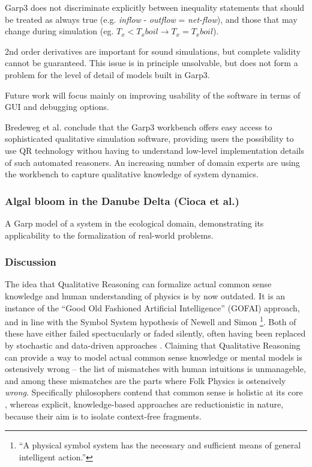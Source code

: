 \documentclass{article} %
\begin{document}
Garp3 does not discriminate explicitly between inequality statements that
should be treated as always true (e.g. \emph{inflow} - \emph{outflow} = 
\emph{net-flow}), and those that may change during simulation 
(eg. $T_x < T_xboil \rightarrow T_x = T_xboil$).

\vspace{0.8em}

2nd order derivatives are important for sound simulations, but complete
validity cannot be guaranteed. This issue is in principle unsolvable, but does
not form a problem for the level of detail of models built in Garp3.  

Future work will focus mainly on improving usability of the software in terms
of GUI and debugging options.

Bredeweg et al. conclude that the Garp3 workbench offers easy access to 
sophisticated qualitative simulation software, providing users the 
possibility to use QR technology withou having to understand low-level 
implementation details of such automated reasoners. An increasing number of 
domain experts are using the workbench to capture qualitative knowledge of 
system dynamics.  

\subsubsection{Algal bloom in the Danube Delta (Cioca et al.)}

A Garp model of a system in the ecological domain, demonstrating its
applicability to the formalization of real-world problems.


\subsubsection{Discussion}

The idea that Qualitative Reasoning can formalize actual common sense knowledge
and human understanding of physics is by now outdated. It is an instance of the
``Good Old Fashioned Artificial Intelligence'' (GOFAI) approach,
\cite{haugeland} and in line with the Symbol System hypothesis of Newell and
Simon \cite{newell}\footnote{``A physical symbol system has the necessary and
sufficient means of general intelligent action.''}.  Both of these have either
failed spectucularly or faded silently, often having been replaced by
stochastic and data-driven approaches \cite{russellnorvig}.  Claiming that
Qualitative Reasoning can provide a way to model actual common sense knowledge
or mental models is ostensively wrong -- the list of mismatches with human
intuitions is unmanageble, and among these mismatches are the parts where Folk
Physics is ostensively {\em wrong}. Specifically philosophers contend that
common sense is holistic at its core \cite{smith}, whereas explicit,
knowledge-based approaches are reductionistic in nature, because their aim is
to isolate context-free fragments. 
\end{document}

